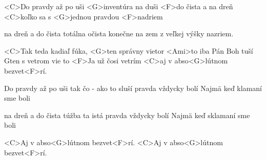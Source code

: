 

\zs
<C>Do pravdy až po uši 
<G>inventúra na duši 
<F>do čista a na dreň 
<C>koľko sa s <G>jednou pravdou <F>nadriem 

na dreň a do čista 
totálna očista 
konečne na zem 
z veľkej výšky nazriem. 
\ks

\zr
<C>Tak teda kadiaľ fúka, <G>ten správny vietor 
<Ami>to iba Pán Boh tuší Gten s vetrom vie to 
<F>Ja už čosi vetrím <C>aj v abso<G>lútnom bezvet<F>rí. 
\kr

\zs
Do pravdy až po uši 
tak čo - ako to sluší 
pravda vždycky bolí 
Najmä keď klamaní sme boli 

na dreň a do čista 
túžba ta istá 
pravda vždycky bolí 
Najmä keď sklamaní sme boli 
\ks

\zr \kr
\zr \kr

<C>Aj v abso<G>lútnom bezvet<F>rí. 
<C>Aj v abso<G>lútnom bezvet<F>rí.

\kp

